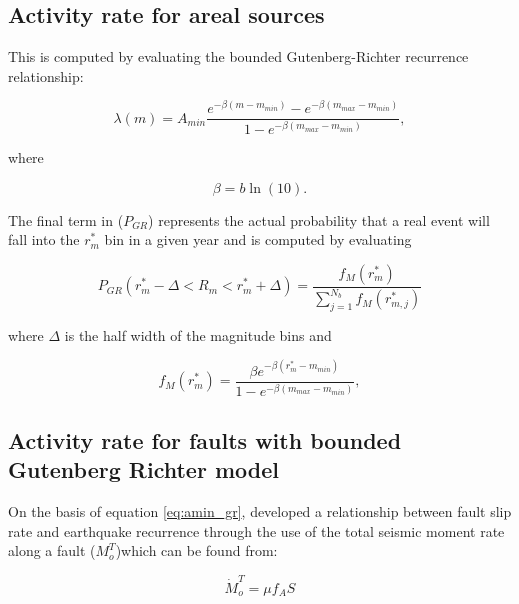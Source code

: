 \begin{enumerate}
\subsection{Activity rate for areal sources} 
\label{sec:rv_areal_GR}


This is computed by evaluating the bounded Gutenberg-Richter recurrence relationship:

\begin{equation} \label{eq:amin_gr}
\lambda(m) =
A_{min}\frac{e^{-\beta(m-m_{min})}-e^{-\beta(m_{max}-m_{min})}}{1-e^{-\beta(m_{max}-m_{min})}},
\end{equation}

where

\begin{equation}
\beta = b\ln(10).
\end{equation}

The final term in  ($P_{GR}$)
represents the actual probability that a real event will fall into
the $r_m^*$ bin in a given year and is computed by evaluating

\begin{equation} \label{eq:P_GR}
P_{GR}(r_m^*-\Delta<R_m<r_m^*+\Delta) =
\frac{f_M(r_m^*)}{\sum\limits_{j=1}^{N_b} f_M(r_{m,j}^*)}
\end{equation}

where $\Delta$ is the half width of the magnitude bins and

\begin{equation} \label{eq:f_m}
f_M(r_m^*) = \frac{\beta
e^{-\beta(r_m^*-m_{min})}}{1-e^{-\beta(m_{max}-m_{min})}},
\end{equation}


\subsection{Activity rate for faults with bounded Gutenberg Richter model}
\label{sec:rv_flt_GR}
On the basis of equation \ref{eq:amin_gr}, \citet{eqrm_Youngs85} developed a relationship between fault slip 
rate and earthquake recurrence through the use of the total seismic moment rate along a fault ($M_o^T$)which can be found from:

\begin{equation} \label{eq:mot}
\dot{M}_o^T = \mu f_A S
\end{equation}


\end{enumerate}
